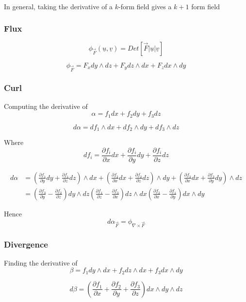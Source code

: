 In general, taking the derivative of a $k$-form field gives a $k+1$ form field

\subsubsection{Flux}
\begin{framed}
\[
   \phi_{\vec{F}} ( \underline{u}, \underline{v}) = Det \left[ \vec{F} | \underline{u} | \underline{v} \right]
\] 

\[
   \phi_{\vec{F} } = F_x dy \wedge dz + F_y dz \wedge dx + F_z dx \wedge dy
\] 
\end{framed}

\subsubsection{Curl}
\begin{framed}
Computing the derivative of 
\[
  \alpha = f_1 dx + f_2 dy + f_3 dz
\] 

\[
  d \alpha = df_1 \wedge dx + df_2 \wedge dy + df_3 \wedge dz
\] 

Where
\[
  df_i = \frac{\partial f_i}{\partial x }  dx + \frac{\partial f_i}{\partial y} dy + \frac{\partial f_i}{\partial z}dz
\] 

\begin{align*}
   d\alpha &= 
   \left( \frac{\partial f_1}{\partial y}dy  + \frac{\partial f_1}{\partial z} dz\right) \wedge dx + 
   \left( \frac{\partial f_2}{\partial x}dx  + \frac{\partial f_2}{\partial z} dz\right) \wedge dy + 
   \left( \frac{\partial f_3}{\partial x}dx  + \frac{\partial f_3}{\partial y} dy\right) \wedge dz  \\
           &= 
           \left( \frac{\partial f_3}{\partial y} - \frac{\partial f_2}{\partial z} \right) dy \wedge dz
           \left( \frac{\partial f_1}{\partial z} - \frac{\partial f_3}{\partial x} \right) dz \wedge dx
           \left( \frac{\partial f_2}{\partial x} - \frac{\partial f_1}{\partial y} \right) dx \wedge dy
\end{align*}

Hence 
\[
   d \alpha_{ \vec{F}} = \phi_{\nabla \times \vec{F}}
\] 
\end{framed}


\subsubsection{Divergence}
\begin{framed}
Finding the derivative of
\[
  \beta = f_1 dy \wedge dx + f_2 dz \wedge dx + f_3 dx \wedge dy
\] 

\[
  d \beta = \left( \frac{\partial f_1}{\partial x} + \frac{\partial f_2}{\partial y} + \frac{\partial f_3}{\partial z} \right) dx \wedge dy \wedge dz
\] 
\end{framed}


